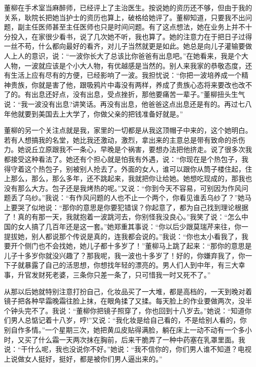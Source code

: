 \documentclass[12pt,oneside]{book}
\begin{document}
董柳在手术室当麻醉师，已经评上了主治医生。按说她的资历还不够，但由于我的关系，耿院长把她当护士的资历也算上，破格给她评了。董柳知道，只要我不出问题，副主任医师甚至主任医师也只是时间问题。有了这点想法，她在业务上并不十分投入，在家很少看书，说了几次她不听，我也算了。她的注意力在于把日子过得一丝不苟，什么都向最好的看齐，对儿子当然就更是如此。她总是向儿子灌输要做人上人的意识，说：``一波你长大了总该比你爸爸有出息吧。''在她看来，我是个大人物，一波就应该是个小大人物，有优越感是当然的。别人来我家的恭敬态度，还有生活上应有尽有的方便，已经影响了一波。我担忧说：``你把一波培养成一个精神贵族，你就是害了他，跟吸鸦片中毒没有两样，养成了贵族心态将来要改也改不了的。有出息还好点，没有出息，受点挫折，那他要痛苦一辈子。''董柳扭头生气说：``我一波没有出息?讲笑话。再没有出息，他爸爸这点出息还是有的。再过七八年他就要到美国去上大学了，你做父亲的把钱准备好就是。''

董柳的另一个关注点就是我，家里的一切都是从我这顶帽子中来的，这个她明白。若有人想搞我的名堂，她比我还激动，激烈，拿出来的主意总是带有致命的杀伤力。她说丘立原跟我不一条心，早晚是个祸害，要想办法把他挤走。说了很多次我都接受这种看法了。她还有个担心就是怕我有外遇，说：``你现在是个热包子，我得守着这个热包子，别被别人抢去了。外面的女人，谁可以跟你从筒子楼住起，住上那么，那么，那么多年，还不跳起来，我就把你让给她。她想吃现成的，那我也没有那么大方。包子还是我烤热的呢。''又说：``你到今天不容易，可别因为作风问题丢了乌纱。''我说：``有作风问题的人也不止一个两个，你看见谁丢乌纱了？''她马上要哭了似地说：``那你的意思是你要犯错误？你起意了，都为自己找到理论根据了！真的有那一天，我就抱着一波跳河去，你别怪我没良心。''我笑了说：``怎么中国的女人搞了几百年还是这一套。''她郑重其事说：``你以后少跟莫瑞芹来往，你一提拔她，别人都说那个传说是真的，连我都会说的。''我说：``你也太小看我了，我要开个侧门也不会找她，她儿子都十多岁了！''董柳马上跳了起来：``那你的意思是儿子十多岁你就没兴趣了？那我呢，我一波也十多岁了！好的，你嫌弃我了，你一下子就暴露了自己的活思想，你想找年轻的漂亮的。男人们人到中年，有三大幸事，升官发财死老婆，三条你只差一条了，只可惜我一时又死不了。''

从那以后她就特别注意打扮自己，化妆品买了一大堆，都是高档的，一天到晚对着镜子把各种早霜晚霜往脸上抹，在眼角揉了又揉。每天脸上的作业要做两次，没半个钟头完不了。我说：``董柳你把镜子照穿了，你也回到十八岁去。''她说：``知道你们男人总惦记着十八岁，哼!''又说：``我化妆是给自己看的，不是给别人看的，你别自作多情。''一个星期三次，她把黄瓜皮贴得满脸，躺在床上一动不动有一个多小时，又买了什么霜一天两次抹在胸前，后来干脆弄了一种中药塞在乳罩里面。我说：``干什么呢，我也没说你不好。''她说：``我不信你的，你们男人谁不知道？电视上说做女人挺好，挺好，都是被你们男人逼出来的。''
\end{document}
